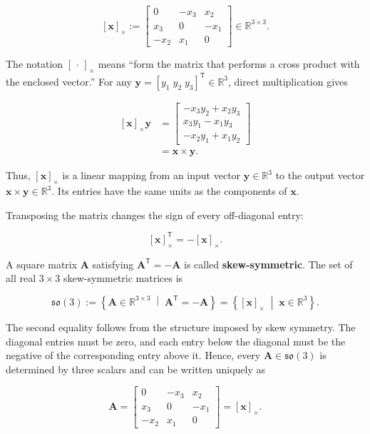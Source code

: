 \documentclass[
  australian,
  12pt,
  letterpaper,
  DIV=11,
  numbers=noendperiod,
  twoside]{scrreprt}
\begin{document}
\[
\boxed{
[\mathbf x]_\times
\mathrel{:=}
\begin{bmatrix}
0&-x_3&x_2\\
x_3&0&-x_1\\
-x_2&x_1&0
\end{bmatrix}
\in\mathbb R^{3\times3}
}.
\]

The notation \([\,\cdot\,]_\times\) means ``form the matrix that
performs a cross product with the enclosed vector.'' For any
\(\mathbf y=[y_1\;y_2\;y_3]^\mathsf T\in\mathbb R^3\), direct
multiplication gives

\[
\begin{aligned}
\left[\mathbf x\right]_\times \mathbf y
&=
\begin{bmatrix}
-x_3y_2+x_2y_3\\
x_3y_1-x_1y_3\\
-x_2y_1+x_1y_2
\end{bmatrix}\\
&=
\boxed{
\mathbf x\times\mathbf y
}.
\end{aligned}
\]

Thus, \([\mathbf x]_\times\) is a linear mapping from an input vector
\(\mathbf y\in\mathbb R^3\) to the output vector
\(\mathbf x\times\mathbf y\in\mathbb R^3\). Its entries have the same
units as the components of \(\mathbf x\).

Transposing the matrix changes the sign of every off-diagonal entry:

\[
[\mathbf x]_\times^\mathsf T
=
-[\mathbf x]_\times.
\]

A square matrix \(\mathbf A\) satisfying
\(\mathbf A^\mathsf T=-\mathbf A\) is called \textbf{skew-symmetric}.
The set of all real \(3\times3\) skew-symmetric matrices is

\[
\boxed{
\mathfrak{so}(3)
\mathrel{:=}
\left\{
\mathbf A\in\mathbb R^{3\times3}
\;\middle|\;
\mathbf A^\mathsf T=-\mathbf A
\right\}
=
\left\{
[\mathbf x]_\times
\;\middle|\;
\mathbf x\in\mathbb R^3
\right\}
}.
\]

The second equality follows from the structure imposed by skew symmetry.
The diagonal entries must be zero, and each entry below the diagonal
must be the negative of the corresponding entry above it. Hence, every
\(\mathbf A\in\mathfrak{so}(3)\) is determined by three scalars and can
be written uniquely as

\[
\mathbf A
=
\begin{bmatrix}
0&-x_3&x_2\\
x_3&0&-x_1\\
-x_2&x_1&0
\end{bmatrix}
=
[\mathbf x]_\times.
\]
\end{document}
